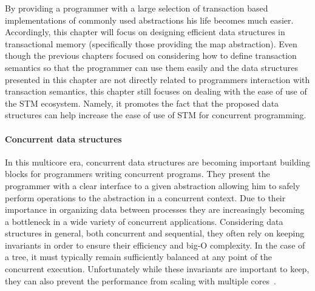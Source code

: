 \documentclass[runningheads,a4paper]{article}
\begin{document}
By providing a programmer with a large selection of transaction based implementations of commonly used abstractions
his life becomes much easier.
Accordingly, this chapter will focus on designing efficient data structures in transactional memory (specifically those providing the map abstraction).
Even though the previous chapters focused on considering how to define transaction semantics so that the programmer can use them easily and
the data structures presented in this chapter are not directly related to programmers interaction with transaction semantics,
this chapter still focuses on dealing with the ease of use of the STM ecosystem.
Namely, it promotes the fact that the proposed data structures can help increase the ease of use of STM for concurrent programming.


\paragraph{Concurrent data structures}
In this multicore era, concurrent data structures are becoming important building blocks
for programmers writing concurrent programs.
They present the programmer with a clear interface to a given abstraction allowing
him to safely perform operations to the abstraction in a concurrent context.
Due to their importance in organizing data between processes they are increasingly becoming a bottleneck
in a wide variety of concurrent applications.
Considering data structures in general, both concurrent and sequential, they often rely on keeping invariants
in order to ensure their efficiency and big-O complexity.
In the case of a tree, it must typically remain sufficiently balanced at any point of the concurrent execution.
Unfortunately while these invariants are important to keep, they can also prevent
the performance from scaling with multiple cores~\cite{Sha2011}.
\end{document}
